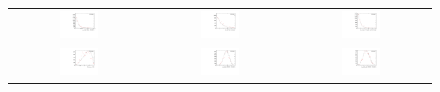 \begin{figure}
\centering
\begin{tabular}{ccc}
\includegraphics[width=0.3\textwidth]{ANA_resources/Plots/Monte_carlo/data_vs_MC/Kpi/acos(Bd_DIRA_OWNPV)_2012.pdf} & \includegraphics[width=0.3\textwidth]{ANA_resources/Plots/Monte_carlo/data_vs_MC/Kpi/Bd_IPCHI2_OWNPV_2012.pdf} & \includegraphics[width=0.3\textwidth]{ANA_resources/Plots/Monte_carlo/data_vs_MC/Kpi/Bd_LOKI_VFASPF_VCHI2VDOF_2012.pdf} \\
\includegraphics[width=0.3\textwidth]{ANA_resources/Plots/Monte_carlo/data_vs_MC/Kpi/Bd_ptasy_1_50_2012.pdf} & \includegraphics[width=0.3\textwidth]{ANA_resources/Plots/Monte_carlo/data_vs_MC/Kpi/log10(D0_IPCHI2_OWNPV)_2012.pdf} & \includegraphics[width=0.3\textwidth]{ANA_resources/Plots/Monte_carlo/data_vs_MC/Kpi/log10(KstarK_IPCHI2_OWNPV)_2012.pdf} \\

\end{tabular}
\end{figure}
